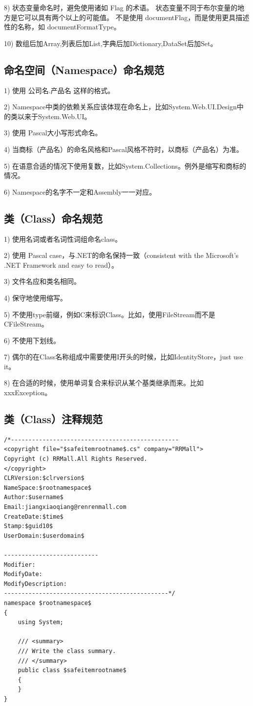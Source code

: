 \documentclass{book}
\begin{document}
8)  状态变量命名时，避免使用诸如 Flag 的术语。
状态变量不同于布尔变量的地方是它可以具有两个以上的可能值。
不是使用 documentFlag，而是使用更具描述性的名称，如 documentFormatType。

10) 数组后加Array,列表后加List,字典后加Dictionary,DataSet后加Set。

\subsection{命名空间（Namespace）命名规范}

1)  使用 公司名.产品名 这样的格式。

2)  Namespace中类的依赖关系应该体现在命名上，比如System.Web.UI.Design中的类以来于System.Web.UI。

3)  使用 Pascal大小写形式命名。

4)  当商标（产品名）的命名风格和Pascal风格不符时，以商标（产品名）为准。

5)  在语意合适的情况下使用复数，比如System.Collections。例外是缩写和商标的情况。

6)  Namespace的名字不一定和Assembly一一对应。

\subsection{类（Class）命名规范}

1)  使用名词或者名词性词组命名class。

2)  使用 Pascal case，与.NET的命名保持一致（consistent with the Microsoft's .NET Framework and easy to read）。

3)  文件名应和类名相同。

4)  保守地使用缩写。

5)  不使用type前缀，例如C来标识Class。比如，使用FileStream而不是CFileStream。

6)  不使用下划线。

7)  偶尔的在Class名称组成中需要使用I开头的时候，比如IdentityStore，just use it。

8)  在合适的时候，使用单词复合来标识从某个基类继承而来。比如xxxException。

\subsection{类（Class）注释规范}\label{ClassNamingSpecification}

\begin{lstlisting}[language={[Sharp]C}]
/*------------------------------------------------
<copyright file="$safeitemrootname$.cs" company="RRMall">
Copyright (c) RRMall.All Rights Reserved.
</copyright>
CLRVersion:$clrversion$
NameSpace:$rootnamespace$ 
Author:$username$
Email:jiangxiaoqiang@renrenmall.com
CreateDate:$time$
Stamp:$guid10$
UserDomain:$userdomain$

---------------------------
Modifier:
ModifyDate:
ModifyDescription:
-----------------------------------------------*/
namespace $rootnamespace$
{
	using System;
	
	/// <summary>
    /// Write the class summary. 
    /// </summary>
    public class $safeitemrootname$
    {
    }
}		
\end{lstlisting}
\end{document}
